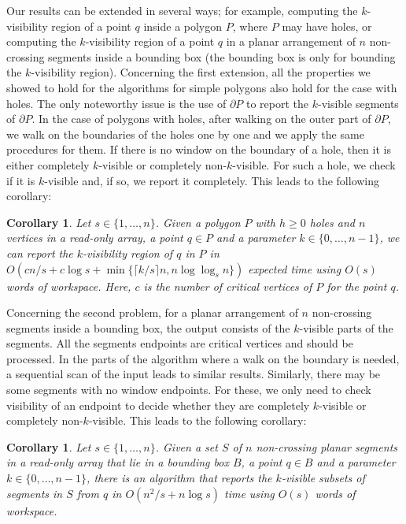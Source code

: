 \documentclass[11pt, a4paper]{article}
\newtheorem{cor}[theorem1]{Corollary}{\bfseries}{\itshape}
\begin{document}
Our results can be extended in several ways; for example, computing 
the $k$-visibility region of a point $q$ inside a polygon $P$, where 
$P$ may have holes, or computing the $k$-visibility region of a 
point $q$ in a planar arrangement of $n$ non-crossing segments 
inside a bounding box (the bounding box is only for bounding the 
$k$-visibility region). Concerning the first extension, all the properties
we showed to hold for the algorithms for simple polygons
also hold for the case with holes. The only noteworthy 
issue is the use of $\partial P$ to 
report the $k$-visible segments of $\partial P$. In the case of 
polygons with holes, after walking on the outer part of 
$\partial P$, we walk on the boundaries of the holes one by one and 
we apply the same procedures for them. If there is no window on the 
boundary of a hole, then it is either completely $k$-visible or 
completely non-$k$-visible. For such a hole, we check if it is 
$k$-visible and, if so, we report it completely. 
This leads to the following corollary:

\begin{cor}\label{cor:polygon with holes}
Let $s \in \{1, \dots, n\}$.
Given a polygon $P$ with $h \geq 0$ holes and $n$ vertices in a 
read-only array, a point $q \in P$ and a parameter 
$k \in \{0, \dots, n - 1\}$, we can report the $k$-visibility region of $q$ in $P$ in  
$O(cn/s+c\log{s}+\min\{\lceil k/s\rceil n,n\log{\log_s{n}}\})$ 
expected time using $O(s)$ words of workspace. Here, $c$ is the 
number of critical vertices of $P$ for the point $q$.
\end{cor}

Concerning the second problem, for a planar arrangement of $n$ non-crossing 
segments inside a bounding box, the output consists of the 
$k$-visible parts of the segments. All the segments endpoints 
are critical vertices and should be processed. In the parts of the 
algorithm where a walk on the boundary is needed, a sequential scan 
of the input leads to similar results. Similarly, there may be some 
segments with no window endpoints. For these, we only need to check 
visibility of an endpoint to decide whether they are completely 
$k$-visible or completely non-$k$-visible. 
This leads to the following corollary:

\begin{cor}\label{cor:segments}
Let $s \in \{1, \dots, n\}$.
Given a set $S$ of $n$ non-crossing planar segments in a read-only 
array that lie in a bounding box $B$, a point $q \in B$ and a 
parameter $k \in \{0, \dots, n - 1\}$, there is an algorithm that 
reports the $k$-visible subsets of segments in $S$ from $q$ in
$O(n^2/s+n\log{s})$ time using $O(s)$ words of workspace.
\end{cor}
\end{document}
